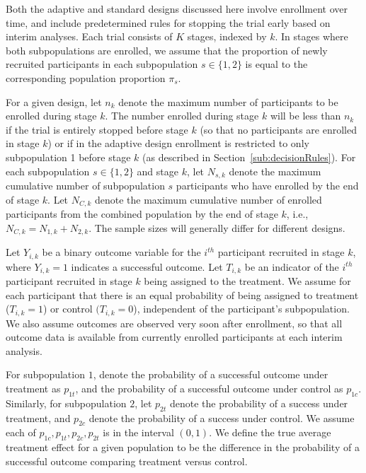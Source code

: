 \documentclass[article]{jss}
\begin{document}
Both the adaptive and standard designs discussed here involve enrollment over time, and include predetermined rules for stopping the trial early based on interim analyses. Each trial consists of $K$ stages, indexed by $k$. 
In stages where both subpopulations are enrolled, we assume that the proportion of newly recruited participants  in each subpopulation $s \in \{1,2\}$ is equal to the corresponding population proportion $\pi_s$.

For a given design, let $n_k$ denote the maximum number of participants to be enrolled during stage $k$. The number enrolled during stage $k$ will be less than $n_k$ if the trial is entirely stopped before stage $k$ (so that no participants are enrolled in stage $k$) or if in the adaptive design enrollment is restricted to only subpopulation 1 before stage $k$ (as described in Section~\ref{sub:decisionRules}). For each subpopulation $s \in \{1,2\}$ and stage $k$, let $N_{s,k}$ denote the maximum cumulative number of subpopulation $s$ participants who have enrolled by the end of stage $k$. Let $N_{C,k}$ denote the maximum cumulative number of enrolled participants from the combined population by the end of stage $k$, i.e.,  $N_{C,k}=N_{1,k}+N_{2,k}$.
The sample sizes will generally differ for different designs.

Let $Y_{i,k}$ be a binary outcome variable for the $i^{th}$ participant recruited in stage $k$, where $Y_{i,k}=1$ indicates a successful outcome. Let $T_{i,k}$ be an indicator of   the $i^{th}$ participant recruited in stage $k$ being assigned to the treatment. We assume for each participant that there is an equal probability of being assigned to  treatment ($T_{i,k}=1$) or control $(T_{i,k}=0$), independent of the participant's subpopulation. We also assume outcomes are observed very soon after enrollment, so that all outcome data is available from currently enrolled participants at each interim analysis.

For subpopulation $1$, denote the probability of a successful outcome under treatment as $p_{1t}$, and the probability of a successful outcome under control as $p_{1c}$. Similarly, for subpopulation $2$, let $p_{2t}$ denote the probability of a success under treatment, and $p_{2c}$ denote the probability of a success under control. 
We assume each of $p_{1c},p_{1t},p_{2c},p_{2t}$ is in the interval $(0,1)$.
We define the true average treatment effect for a given population to be the difference in the probability of a successful outcome comparing treatment versus control.
\end{document}
